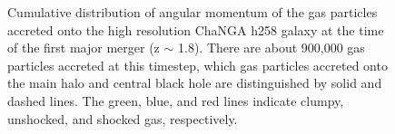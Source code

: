 \documentclass[manuscript]{aastex}
\begin{document}
\begin{figure}
\centerline{}
\caption[]{ Cumulative distribution of angular momentum of the gas particles accreted onto the high resolution ChaNGA h258 galaxy at the time of the first major merger (z $\sim$ 1.8). There are about 900,000 gas particles accreted at this timestep, which gas particles accreted onto the main halo and central black hole are distinguished by solid and dashed lines. The green, blue, and red lines indicate clumpy, unshocked, and shocked gas, respectively.}
\label{hrh258angmom_merger1} 
\end{figure}


\end{document}
